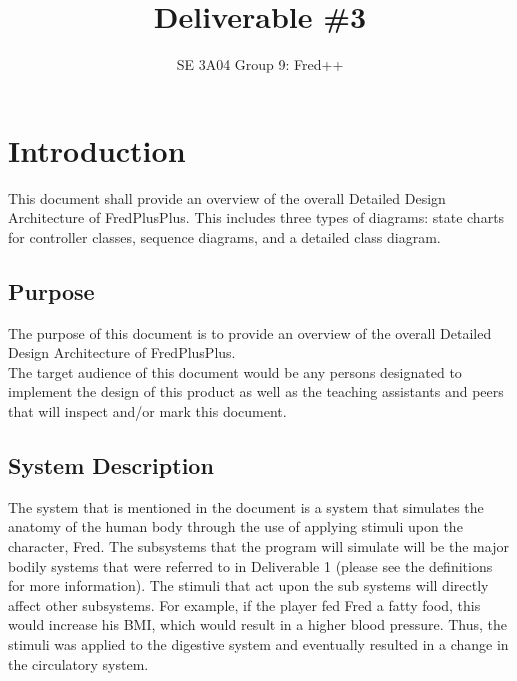 \documentclass[]{article}
\title{Deliverable \#3}
\author{SE 3A04 Group 9: Fred++}
\date{}
\begin{document}
\maketitle	

\tableofcontents
\listoffigures

\newpage

\section{Introduction}
\label{sec:introduction}


This document shall provide an overview of the overall Detailed Design Architecture of FredPlusPlus. This includes three types of diagrams: state charts for controller classes, sequence diagrams, and a detailed class diagram.




\subsection*{Purpose}
\label{sub:purpose}

The purpose of this document is to provide an overview of the overall Detailed Design Architecture of FredPlusPlus.\\
The target audience of this document would be any persons designated to implement the design of this product as well as the teaching assistants and peers that will
inspect and/or mark this document.

\subsection*{System Description}
\label{sub:system_description}
The system that is mentioned in the document is a system that simulates the anatomy of the human body through the use of applying stimuli upon the character, Fred. The subsystems that the program will simulate will be the major bodily systems that were referred to in Deliverable 1 (please see the definitions for more information). The stimuli that act upon the sub systems will directly affect other subsystems. For example, if the player fed Fred a fatty food, this would increase his BMI, which would result in a higher blood pressure. Thus, the stimuli was applied to the digestive system and eventually resulted in a change in the circulatory system.
	
\end{document}
